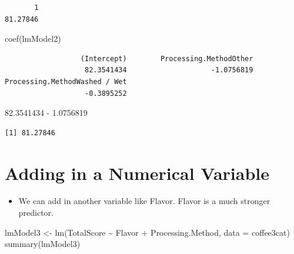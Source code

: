 \documentclass[
  letterpaper,
  DIV=11,
  numbers=noendperiod]{scrreprt}
\newenvironment{Shaded}{\begin{snugshade}}{\end{snugshade}}
\newcommand{\AttributeTok}[1]{\textcolor[rgb]{0.40,0.45,0.13}{#1}}
\newcommand{\FloatTok}[1]{\textcolor[rgb]{0.68,0.00,0.00}{#1}}
\newcommand{\FunctionTok}[1]{\textcolor[rgb]{0.28,0.35,0.67}{#1}}
\newcommand{\NormalTok}[1]{\textcolor[rgb]{0.00,0.23,0.31}{#1}}
\newcommand{\OtherTok}[1]{\textcolor[rgb]{0.00,0.23,0.31}{#1}}
\newcommand{\SpecialCharTok}[1]{\textcolor[rgb]{0.37,0.37,0.37}{#1}}
\providecommand{\tightlist}{%
  \setlength{\itemsep}{0pt}\setlength{\parskip}{0pt}}\usepackage{longtable,booktabs,array}
\begin{document}
\begin{verbatim}
       1 
81.27846 
\end{verbatim}

\begin{Shaded}
\begin{Highlighting}[]
\FunctionTok{coef}\NormalTok{(lmModel2)}
\end{Highlighting}
\end{Shaded}

\begin{verbatim}
                  (Intercept)        Processing.MethodOther 
                   82.3541434                    -1.0756819 
Processing.MethodWashed / Wet 
                   -0.3895252 
\end{verbatim}

\begin{Shaded}
\begin{Highlighting}[]
\FloatTok{82.3541434} \SpecialCharTok{{-}} \FloatTok{1.0756819}
\end{Highlighting}
\end{Shaded}

\begin{verbatim}
[1] 81.27846
\end{verbatim}

\section{Adding in a Numerical
Variable}\label{adding-in-a-numerical-variable}

\begin{itemize}
\tightlist
\item
  We can add in another variable like Flavor. Flavor is a much stronger
  predictor.
\end{itemize}

\begin{Shaded}
\begin{Highlighting}[]
\NormalTok{lmModel3 }\OtherTok{\textless{}{-}} \FunctionTok{lm}\NormalTok{(TotalScore }\SpecialCharTok{\textasciitilde{}}\NormalTok{ Flavor }\SpecialCharTok{+}\NormalTok{ Processing.Method, }\AttributeTok{data =}\NormalTok{ coffee3cat)}
\FunctionTok{summary}\NormalTok{(lmModel3)}
\end{Highlighting}
\end{Shaded}
\end{document}
